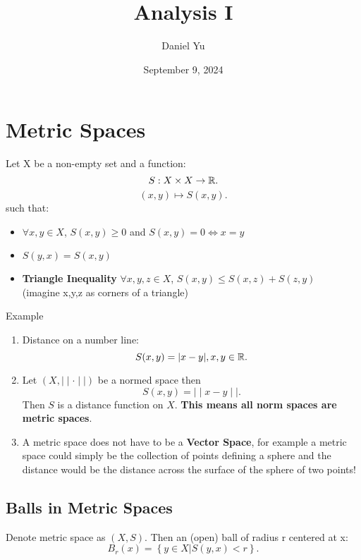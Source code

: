 \documentclass[a4paper]{article}
\title{\Huge{Analysis I}}
\author{\huge{Daniel Yu}}
\date{September 9, 2024}
\begin{document}
\maketitle
\newpage%
\tableofcontents
\pagebreak

\section{Metric Spaces}
\begin{definition}
  Let X be a non-empty set and a function:
  \[
  S: X \times X \to \mathbb{R}
  .\]
  \[
    \left( x,y \right) \longmapsto S\left( x,y \right) 
  .\] such that:
  \begin{itemize}
    \item $\forall x,y \in X$,  $S(x,y) \geq 0$ and  $S(x,y) = 0 \iff x =y$
    \item $S(y,x) = S(x,y)$
    \item \textbf{Triangle Inequality} $\forall x,y,z \in X$, $S(x,y) \leq S(x,z) + S(z,y)$ \\
      (imagine x,y,z as corners of a triangle)
  \end{itemize}
\end{definition}

\begin{remark}{Example}
  \begin{enumerate}
    \item Distance on a number line: \[
      S(x,y) = |x - y|, x,y \in \mathbb{R} 
    .\] 
    \item Let $\left( X,  \mid  \mid \cdot  \mid  \mid  \right) $ be a normed space then \[
    S(x,y) =  \mid  \mid x - y \mid  \mid 
  .\]Then $S$ is a distance function on $X$. \textbf{This means all norm spaces are metric spaces}.
\item A metric space does not have to be a \textbf{Vector Space}, for example a metric space could simply be the 
  collection of points defining a sphere and the distance would be the distance across the surface of the sphere 
  of two points!
  \end{enumerate}
\end{remark}

\subsection{Balls in Metric Spaces}

\begin{definition}
 Denote metric space as $\left( X, S \right)$. Then an (open) ball of radius r centered at x:
\[
  B_r (x) = \left\{ y \in X | S(y,x) < r \right\}  
.\]  
\end{definition}
\end{document}
